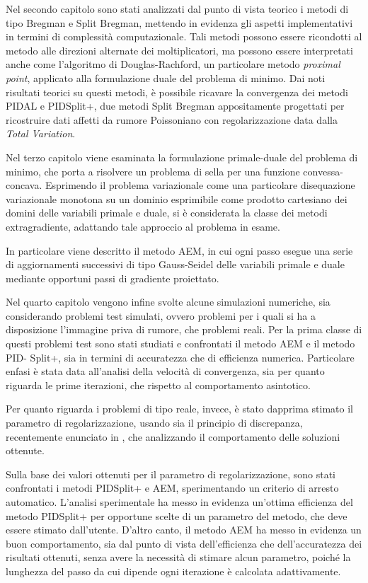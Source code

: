 Nel secondo capitolo sono stati analizzati dal punto di vista teorico i metodi di tipo Bregman e Split Bregman, mettendo in evidenza gli aspetti implementativi in termini di complessit\`{a} computazionale. Tali metodi possono essere ricondotti al metodo alle direzioni alternate dei moltiplicatori, ma possono essere interpretati anche come l'algoritmo di Douglas-Rachford, un particolare metodo \emph{proximal point}, applicato alla formulazione duale del problema di minimo. Dai noti risultati teorici su questi metodi, \`{e} possibile ricavare la convergenza dei metodi PIDAL e PIDSplit+, due metodi Split Bregman appositamente progettati per ricostruire dati affetti da rumore Poissoniano con regolarizzazione data dalla \emph{Total Variation}.

Nel terzo capitolo viene esaminata la formulazione primale-duale del problema di minimo, che porta a risolvere un problema di sella per una funzione convessa-concava. Esprimendo il problema variazionale come una particolare disequazione variazionale monotona su un dominio esprimibile come prodotto cartesiano dei domini delle variabili primale e duale, si \`{e} considerata la classe dei metodi extragradiente, adattando tale approccio al problema in esame.

In particolare viene descritto il metodo AEM, in cui ogni passo esegue una serie di aggiornamenti successivi di tipo Gauss-Seidel delle variabili primale e duale mediante opportuni passi di gradiente proiettato.

Nel quarto capitolo vengono infine svolte alcune simulazioni numeriche, sia considerando problemi test simulati, ovvero problemi per i quali si ha a disposizione l'immagine priva di rumore, che problemi reali. Per la prima classe di questi problemi test sono stati studiati e confrontati il metodo AEM e il metodo PID-
Split+, sia in termini di accuratezza che di efficienza numerica. Particolare enfasi \`{e} stata data all'analisi della velocit\`{a} di convergenza, sia per quanto riguarda le prime iterazioni, che rispetto al comportamento asintotico.

Per quanto riguarda i problemi di tipo reale, invece,  \`{e} stato dapprima stimato il parametro di regolarizzazione, usando sia il principio di discrepanza, recentemente enunciato in \citep{discr_princ}, che analizzando il comportamento delle soluzioni ottenute.

Sulla base dei valori ottenuti per il parametro di regolarizzazione, sono stati confrontati i metodi PIDSplit+ e AEM, sperimentando un criterio di arresto automatico. L'analisi sperimentale ha messo in evidenza un'ottima efficienza del metodo PIDSplit+ per opportune scelte di un parametro del metodo, che deve essere stimato dall'utente. D'altro canto, il metodo AEM ha messo in evidenza un buon comportamento, sia dal punto di vista dell'efficienza che dell'accuratezza dei risultati ottenuti, senza avere la necessit\`{a} di stimare alcun parametro, poich\'{e} la lunghezza del passo da cui dipende ogni iterazione \`{e} calcolata adattivamente.

